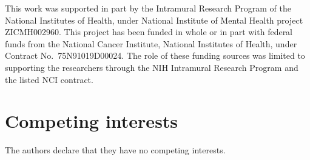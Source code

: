 \documentclass{jors}
\begin{document}
This work was supported in part by the Intramural Research Program of the National
Institutes of Health, under National Institute of Mental Health project
ZICMH002960. This project has been funded in whole or in part with federal
funds from the National Cancer Institute, National Institutes of Health,
under Contract No.\ 75N91019D00024. The role of these funding sources was
limited to supporting the researchers through the NIH Intramural Research
Program and the listed NCI contract.

\section*{Competing interests}

The authors declare that they have no competing interests.


{\raggedright

}
\end{document}
